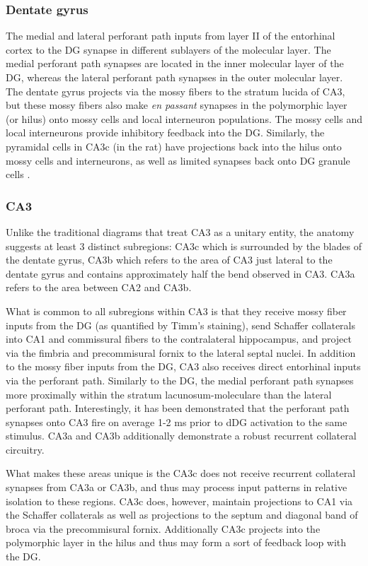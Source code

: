 \documentclass[doc, longtable]{apa6}
\begin{document}
\subsubsection{Dentate gyrus}
The medial and lateral perforant path inputs from layer II of the entorhinal cortex to the DG synapse in different sublayers of the molecular layer. The medial perforant path synapses are located in the inner molecular layer of the DG, whereas the lateral perforant path synapses in the outer molecular layer. The dentate gyrus projects via the mossy fibers to the stratum lucida of CA3, but these mossy fibers also make \textit{en passant} synapses in the polymorphic layer (or hilus) onto mossy cells and local interneuron populations. The mossy cells and local interneurons provide inhibitory feedback into the DG. Similarly, the pyramidal cells in CA3c (in the rat) have projections back into the hilus onto mossy cells and interneurons, as well as limited synapses back onto DG granule cells \parencite{Kesner2013, hunsaker2008role}.

\subsubsection{CA3}
Unlike the traditional diagrams that treat CA3 as a unitary entity, the anatomy suggests at least 3 distinct subregions: CA3c which is surrounded by the blades of the dentate gyrus, CA3b which refers to the area of CA3 just lateral to the dentate gyrus and contains approximately half the bend observed in CA3. CA3a refers to the area between CA2 and CA3b. 

What is common to all subregions within CA3 is that they receive mossy fiber inputs from the DG (as quantified by Timm's staining), send Schaffer collaterals into CA1 and commissural fibers to the contralateral hippocampus, and project via the fimbria and precommisural fornix to the lateral septal nuclei. In addition to the mossy fiber inputs from the DG, CA3 also receives direct entorhinal inputs via the perforant path. Similarly to the DG, the medial perforant path synapses more proximally within the stratum lacunosum-moleculare than the lateral perforant path. Interestingly, it has been demonstrated that the perforant path synapses onto CA3 fire on average 1-2 ms prior to dDG activation to the same stimulus. CA3a and CA3b additionally demonstrate a robust recurrent collateral circuitry.

What makes these areas unique is the CA3c does not receive recurrent collateral synapses from CA3a or CA3b, and thus may process input patterns in relative isolation to these regions. CA3c does, however, maintain projections to CA1 via the Schaffer collaterals as well as projections to the septum and diagonal band of broca via the precommisural fornix. Additionally CA3c projects into the polymorphic layer in the hilus and thus may form a sort of feedback loop with the DG. 
\end{document}
